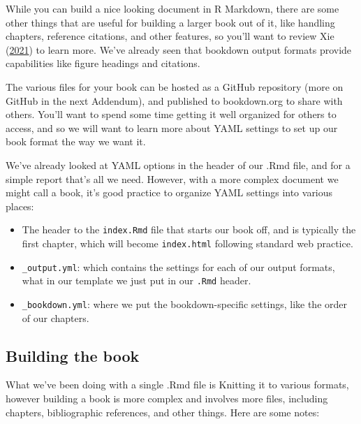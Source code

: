 \documentclass[
]{book}
\providecommand{\tightlist}{%
  \setlength{\itemsep}{0pt}\setlength{\parskip}{0pt}}
\begin{document}
While you can build a nice looking document in R Markdown, there are some other things that are useful for building a larger book out of it, like handling chapters, reference citations, and other features, so you'll want to review Xie (\protect\hyperlink{ref-Bookdown}{2021}) to learn more. We've already seen that bookdown output formats provide capabilities like figure headings and citations.

The various files for your book can be hosted as a GitHub repository (more on GitHub in the next Addendum), and published to bookdown.org to share with others. You'll want to spend some time getting it well organized for others to access, and so we will want to learn more about YAML settings to set up our book format the way we want it.

We've already looked at YAML options in the header of our .Rmd file, and for a simple report that's all we need. However, with a more complex document we might call a book, it's good practice to organize YAML settings into various places:

\begin{itemize}
\tightlist
\item
  The header to the \texttt{index.Rmd} file that starts our book off, and is typically the first chapter, which will become \texttt{index.html} following standard web practice.
\item
  \texttt{\_output.yml}: which contains the settings for each of our output formats, what in our template we just put in our \texttt{.Rmd} header.
\item
  \texttt{\_bookdown.yml}: where we put the bookdown-specific settings, like the order of our chapters.
\end{itemize}

\hypertarget{building-the-book}{%
\subsection{Building the book}\label{building-the-book}}

What we've been doing with a single .Rmd file is Knitting it to various formats, however building a book is more complex and involves more files, including chapters, bibliographic references, and other things. Here are some notes:
\end{document}

